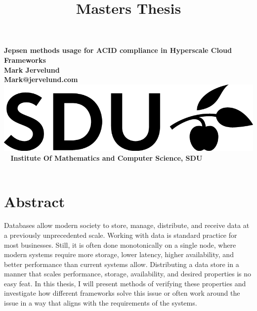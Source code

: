 \documentclass[a4paper,10pt,titlepage]{report}
\date{}
\title{Masters Thesis}
\begin{document}
    \begin{titlepage}
        \centering
        \vspace*{9\baselineskip}
        \huge
        \bfseries
        Jepsen methods usage for ACID compliance in Hyperscale Cloud Frameworks \\
        \normalfont
        Mark Jervelund \\
        Mark@jervelund.com \\
        \vspace*{9\baselineskip}
        \normalfont
        \includegraphics[scale=1]{logos/SDU_BLACK.png}
        \vfill\
        \vspace{5mm}
        Institute Of Mathematics and Computer Science, SDU \\

        \textbf{\datedate} \\[2\baselineskip]
    \end{titlepage}

    \renewcommand{\thepage}{\roman{page}}%
    \tableofcontents
    \newpage
    \setcounter{page}{1}
    \renewcommand{\thepage}{\arabic{page}}


    \section*{Abstract}
    Databases allow modern society to store, manage, distribute, and receive data at a previously unprecedented scale. Working with data is standard practice for most businesses. Still, it is often done monotonically on a single node, where modern systems require more storage, lower latency, higher availability, and better performance than current systems allow. Distributing a data store in a manner that scales performance, storage, availability, and desired properties is no easy feat. In this thesis, I will present methods of verifying these properties and investigate how different frameworks solve this issue or often work around the issue in a way that aligns with the requirements of the systems. \\
    \vspace{5mm}
\end{document}
